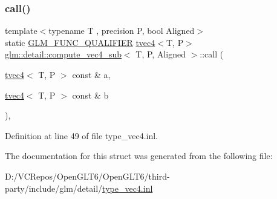 \subsubsection{\texorpdfstring{call()}{call()}}
{\footnotesize\ttfamily template$<$typename T , precision P, bool Aligned$>$ \\
static \mbox{\hyperlink{setup_8hpp_a33fdea6f91c5f834105f7415e2a64407}{G\+L\+M\+\_\+\+F\+U\+N\+C\+\_\+\+Q\+U\+A\+L\+I\+F\+I\+ER}} \mbox{\hyperlink{structglm_1_1tvec4}{tvec4}}$<$T, P$>$ \mbox{\hyperlink{structglm_1_1detail_1_1compute__vec4__sub}{glm\+::detail\+::compute\+\_\+vec4\+\_\+sub}}$<$ T, P, Aligned $>$\+::call (\begin{DoxyParamCaption}\item[{\mbox{\hyperlink{structglm_1_1tvec4}{tvec4}}$<$ T, P $>$ const \&}]{a,  }\item[{\mbox{\hyperlink{structglm_1_1tvec4}{tvec4}}$<$ T, P $>$ const \&}]{b }\end{DoxyParamCaption})\hspace{0.3cm}{\ttfamily [inline]}, {\ttfamily [static]}}



Definition at line 49 of file type\+\_\+vec4.\+inl.



The documentation for this struct was generated from the following file\+:\begin{DoxyCompactItemize}
\item 
D\+:/\+V\+C\+Repos/\+Open\+G\+L\+T6/\+Open\+G\+L\+T6/third-\/party/include/glm/detail/\mbox{\hyperlink{type__vec4_8inl}{type\+\_\+vec4.\+inl}}\end{DoxyCompactItemize}
